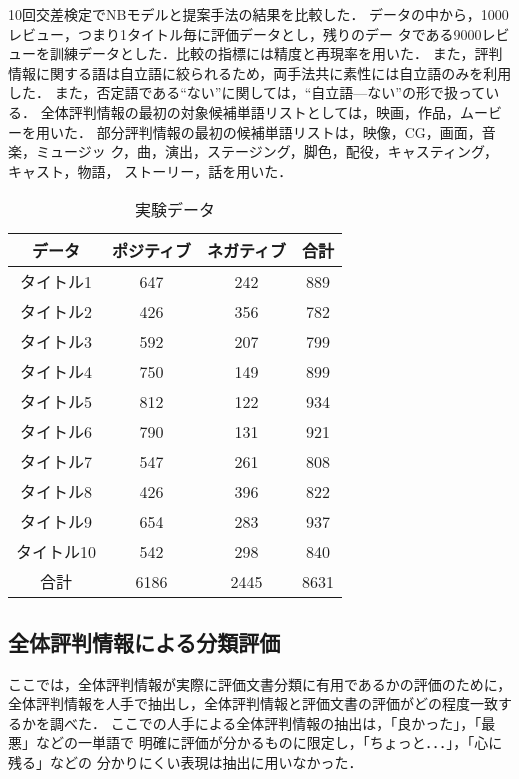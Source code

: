 \documentclass[japanese]{jnlp_1.3c}
\begin{document}
10回交差検定でNBモデルと提案手法の結果を比較した．
データの中から，1000レビュー，つまり1タイトル毎に評価データとし，残りのデー
タである9000レビューを訓練データとした．比較の指標には精度と再現率を用いた．
また，評判情報に関する語は自立語に絞られるため，両手法共に素性には自立語のみを利用した．
また，否定語である“ない”に関しては，“自立語—ない”の形で扱っている．
全体評判情報の最初の対象候補単語リストとしては，映画，作品，ムービーを用いた．
部分評判情報の最初の候補単語リストは，映像，CG，画面，音楽，ミュージッ
ク，曲，演出，ステージング，脚色，配役，キャスティング，キャスト，物語，
ストーリー，話を用いた．

\begin{table}[t]
\caption{実験データ}
\label{train}
\begin{center}
\begin{tabular}{|c|c|c|c|} \hline
 データ & ポジティブ & ネガティブ & 合計 \\ \hline
タイトル1 & 647 & 242 & 889 \\ \hline
タイトル2 & 426 & 356 & 782 \\ \hline
タイトル3 & 592 & 207 & 799 \\ \hline
タイトル4 & 750 & 149 & 899 \\ \hline
タイトル5 & 812 & 122 & 934 \\ \hline
タイトル6 & 790 & 131 & 921 \\ \hline
タイトル7 & 547 & 261 & 808 \\ \hline
タイトル8 & 426 & 396 & 822 \\ \hline
タイトル9 & 654 & 283 & 937 \\ \hline
タイトル10 & 542 & 298 & 840 \\ \hline
合計 & 6186 & 2445 & 8631 \\ \hline
\end{tabular}
\end{center}
\end{table}



\subsection{全体評判情報による分類評価}
ここでは，全体評判情報が実際に評価文書分類に有用であるかの評価のために，
全体評判情報を人手で抽出し，全体評判情報と評価文書の評価がどの程度一致するかを調べた．
ここでの人手による全体評判情報の抽出は，「良かった」，「最悪」などの一単語で
明確に評価が分かるものに限定し，「ちょっと．．．」，「心に残る」などの
分かりにくい表現は抽出に用いなかった．
\end{document}
